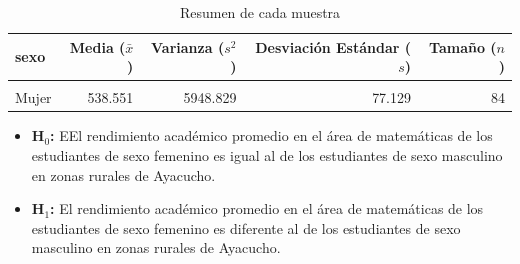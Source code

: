 \documentclass[
]{article}
\begin{document}
\begin{table}[!h]
\centering
\caption{\label{tab:tablasss}Resumen de cada muestra}
\centering
\begin{tabular}[t]{lrrrr}
\toprule
sexo & Media (\(\bar{x}\)) & Varianza (\(s^{2}\)) & Desviación Estándar (\(s\)) & Tamaño (\(n\))\\
\midrule
\cellcolor{gray!10}{Hombre} & \cellcolor{gray!10}{553.216} & \cellcolor{gray!10}{5884.149} & \cellcolor{gray!10}{76.708} & \cellcolor{gray!10}{76}\\
Mujer & 538.551 & 5948.829 & 77.129 & 84\\
\bottomrule
\end{tabular}
\end{table}

\begin{itemize}
    \item \textbf{H$_{0}$:} EEl rendimiento académico promedio en el área de matemáticas de los estudiantes de sexo femenino es igual al de los estudiantes de sexo masculino en zonas rurales de Ayacucho.

  \item \textbf{H$_{1}$:} El rendimiento académico promedio en el área de matemáticas de los estudiantes de sexo femenino es diferente al de los estudiantes de sexo masculino en zonas rurales de Ayacucho.

\end{itemize}
\end{document}
